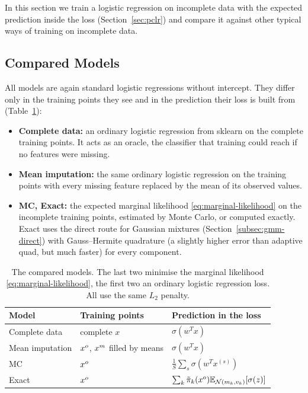 In this section we train a logistic regression on incomplete data with the expected prediction
inside the loss (Section~\ref{sec:pclr}) and compare it against other typical
ways of training on incomplete data.

\subsection{Compared Models}
\label{subsec:training-models}

All models are again standard logistic regressions without intercept. They differ only in the
training points they see and in the prediction their loss is built from
(Table~\ref{tab:training-models}):
\begin{itemize}
  \item \textbf{Complete data:} an ordinary logistic regression from sklearn on the complete
        training points. It acts as an oracle, the classifier that training could reach if no features were missing.
  \item \textbf{Mean imputation:} the same ordinary logistic regression on the training
        points with every missing feature replaced by the mean of its observed
        values.
  \item \textbf{MC, Exact:} the expected marginal likelihood \eqref{eq:marginal-likelihood}
        on the incomplete training points, estimated by Monte
        Carlo, or computed exactly.
        Exact uses the direct route for Gaussian mixtures
        (Section~\ref{subsec:gmm-direct}) with Gauss--Hermite quadrature (a slightly higher error than adaptive quad, but much faster) for every
        component.
\end{itemize}

\begin{table}[htb]
\centering
\small
\renewcommand{\arraystretch}{1.3}
\begin{tabular}{lll}
\hline
\textbf{Model} & \textbf{Training points} & \textbf{Prediction in the loss} \\
\hline
Complete data   & complete $x$                 & $\sigma(w^T x)$ \\
Mean imputation & $x^o$, $x^m$ filled by means & $\sigma(w^T x)$ \\
MC              & $x^o$                        & $\frac{1}{S}\sum_s \sigma(w^T x^{(s)})$ \\
Exact           & $x^o$                        & $\sum_k \tilde\pi_k(x^o) \mathbb{E}_{\mathcal{N}(m_k, v_k)}[\sigma(z)]$ \\
\hline
\end{tabular}
\caption{The compared models. The last two minimise the marginal likelihood
  \eqref{eq:marginal-likelihood}, the first two an ordinary logistic regression
  loss. All use the same $L_2$ penalty.}
\label{tab:training-models}
\end{table}

